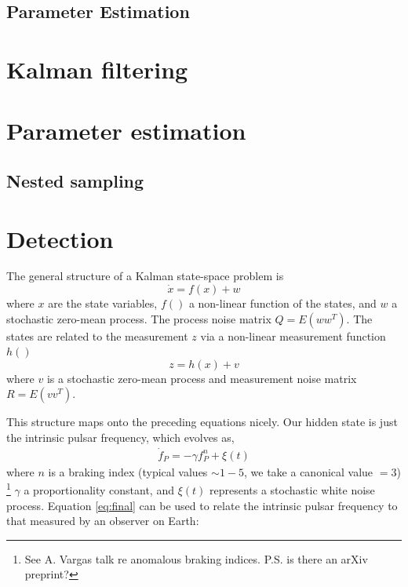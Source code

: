\documentclass[fleqn,usenatbib,useAMS]{mnras}
\begin{document}
\subsection{Parameter Estimation}











\section{Kalman filtering}



\section{Parameter estimation}












\subsection{Nested sampling}


\section{Detection}






\noindent The general structure of a Kalman state-space problem is
\begin{equation}
	\dot{x} = f(x) + w
\end{equation}
where $x$ are the state variables, $f()$ a non-linear function of the states, and $w$ a stochastic zero-mean process. The process noise matrix $Q = E(w w^T)$. The states are related to the measurement $z$ via a non-linear measurement function $h()$
\begin{equation}
	z = h(x) + v
\end{equation}
where $v$ is a stochastic zero-mean process and measurement noise matrix $R = E(v v^T)$. \newline 


\noindent This structure maps onto the preceding equations nicely. Our hidden state is just the intrinsic pulsar frequency, which evolves as,
\begin{eqnarray}
	\dot{f}_P = -\gamma f_P^n + \xi(t)
\end{eqnarray}
where $n$ is a braking index (typical values $\sim 1-5$, we take a canonical value $=3$) \footnote{See A. Vargas talk re anomalous braking indices. P.S. is there an arXiv preprint?} $\gamma$ a proportionality constant, and $\xi(t)$ represents a stochastic white noise process. Equation \ref{eq:final} can be used to relate the intrinsic pulsar frequency to that measured by an observer on Earth:
\end{document}
